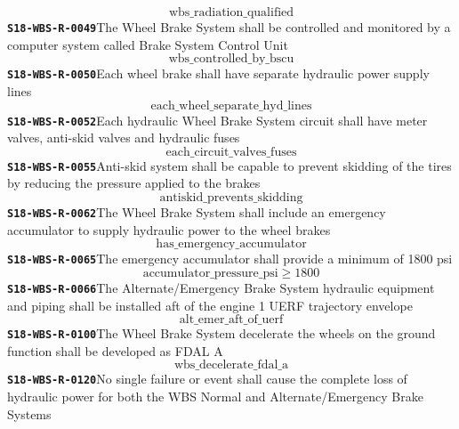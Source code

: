 \documentclass[11pt,a4paper]{article}
\begin{document}
\begin{dmath*}
\text{wbs\_radiation\_qualified}
\end{dmath*}
\noindent\textbf{\texttt{S18-WBS-R-0049}}\quad The Wheel Brake System shall be controlled and monitored by a computer system called Brake System Control Unit
\begin{dmath*}
\text{wbs\_controlled\_by\_bscu}
\end{dmath*}
\noindent\textbf{\texttt{S18-WBS-R-0050}}\quad Each wheel brake shall have separate hydraulic power supply lines
\begin{dmath*}
\text{each\_wheel\_separate\_hyd\_lines}
\end{dmath*}
\noindent\textbf{\texttt{S18-WBS-R-0052}}\quad Each hydraulic Wheel Brake System circuit shall have meter valves, anti-skid valves and hydraulic fuses
\begin{dmath*}
\text{each\_circuit\_valves\_fuses}
\end{dmath*}
\noindent\textbf{\texttt{S18-WBS-R-0055}}\quad Anti-skid system shall be capable to prevent skidding of the tires by reducing the pressure applied to the brakes
\begin{dmath*}
\text{antiskid\_prevents\_skidding}
\end{dmath*}
\noindent\textbf{\texttt{S18-WBS-R-0062}}\quad The Wheel Brake System shall include an emergency accumulator to supply hydraulic power to the wheel brakes
\begin{dmath*}
\text{has\_emergency\_accumulator}
\end{dmath*}
\noindent\textbf{\texttt{S18-WBS-R-0065}}\quad The emergency accumulator shall provide a minimum of 1800 psi
\begin{dmath*}
\text{accumulator\_pressure\_psi} \geq 1800
\end{dmath*}
\noindent\textbf{\texttt{S18-WBS-R-0066}}\quad The Alternate/Emergency Brake System hydraulic equipment and piping shall be installed aft of the engine 1 UERF trajectory envelope
\begin{dmath*}
\text{alt\_emer\_aft\_of\_uerf}
\end{dmath*}
\noindent\textbf{\texttt{S18-WBS-R-0100}}\quad The Wheel Brake System decelerate the wheels on the ground function shall be developed as FDAL A
\begin{dmath*}
\text{wbs\_decelerate\_fdal\_a}
\end{dmath*}
\noindent\textbf{\texttt{S18-WBS-R-0120}}\quad No single failure or event shall cause the complete loss of hydraulic power for both the WBS Normal and Alternate/Emergency Brake Systems
\end{document}
